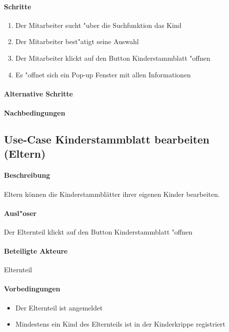   \paragraph{Schritte}
  \begin{enumerate}
   \item Der Mitarbeiter sucht "uber die Suchfunktion das Kind
   \item Der Mitarbeiter best"atigt seine Auswahl
   \item Der Mitarbeiter klickt auf den Button \dq Kinderstammblatt "offnen\dq
   \item Es "offnet sich ein Pop-up Fenster mit allen Informationen
  \end{enumerate}
  
  \paragraph{Alternative Schritte}
  \paragraph{Nachbedingungen}
  
  
  
  
  \newpage
  \subsection{Use-Case Kinderstammblatt bearbeiten (Eltern)}
  \paragraph{Beschreibung}
  Eltern können die Kinderstammblätter ihrer eigenen Kinder bearbeiten. 
  \paragraph{Ausl"oser}
  Der Elternteil klickt auf den Button \dq Kinderstammblatt "offnen\dq
  \paragraph{Beteiligte Akteure}   \leavevmode \newline
  Elternteil
  \paragraph{Vorbedingungen}
  \begin{itemize}
  	\item Der Elternteil ist angemeldet
  	\item Mindestens ein Kind des Elternteils ist in der Kinderkrippe registriert
  \end{itemize}
  
